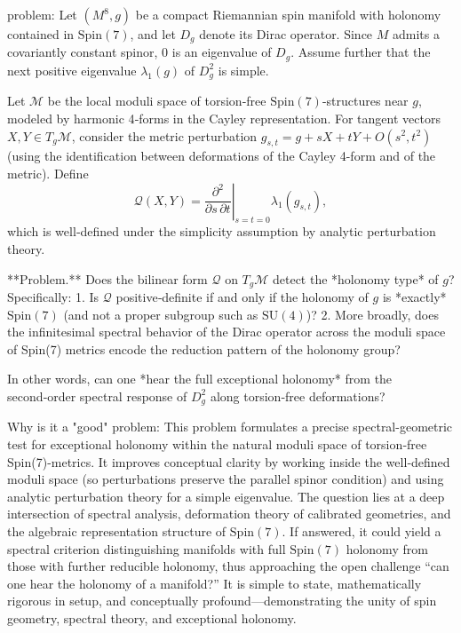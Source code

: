 problem:  
Let \((M^8,g)\) be a compact Riemannian spin manifold with holonomy contained in \(\mathrm{Spin}(7)\), and let \(D_g\) denote its Dirac operator. Since \(M\) admits a covariantly constant spinor, \(0\) is an eigenvalue of \(D_g\). Assume further that the next positive eigenvalue \(\lambda_1(g)\) of \(D_g^2\) is simple.  

Let \(\mathcal{M}\) be the local moduli space of torsion‑free \(\mathrm{Spin}(7)\)-structures near \(g\), modeled by harmonic 4‑forms in the Cayley representation. For tangent vectors \(X,Y\in T_g\mathcal{M}\), consider the metric perturbation \(g_{s,t}=g+sX+tY+O(s^2,t^2)\) (using the identification between deformations of the Cayley 4-form and of the metric). Define
\[
\mathcal{Q}(X,Y)=\left.\frac{\partial^2}{\partial s\,\partial t}\right|_{s=t=0}\lambda_1(g_{s,t}),
\]
which is well‑defined under the simplicity assumption by analytic perturbation theory.  

**Problem.**  
Does the bilinear form \(\mathcal{Q}\) on \(T_g\mathcal{M}\) detect the *holonomy type* of \(g\)? Specifically:
1. Is \(\mathcal{Q}\) positive‑definite if and only if the holonomy of \(g\) is *exactly* \(\mathrm{Spin}(7)\) (and not a proper subgroup such as \(\mathrm{SU}(4)\))?  
2. More broadly, does the infinitesimal spectral behavior of the Dirac operator across the moduli space of Spin(7) metrics encode the reduction pattern of the holonomy group?  

In other words, can one *hear the full exceptional holonomy* from the second‑order spectral response of \(D_g^2\) along torsion‑free deformations?  

Why is it a "good" problem:  
This problem formulates a precise spectral-geometric test for exceptional holonomy within the natural moduli space of torsion‑free Spin(7)-metrics. It improves conceptual clarity by working inside the well‑defined moduli space (so perturbations preserve the parallel spinor condition) and using analytic perturbation theory for a simple eigenvalue. The question lies at a deep intersection of spectral analysis, deformation theory of calibrated geometries, and the algebraic representation structure of \(\mathrm{Spin}(7)\). If answered, it could yield a spectral criterion distinguishing manifolds with full \(\mathrm{Spin}(7)\) holonomy from those with further reducible holonomy, thus approaching the open challenge “can one hear the holonomy of a manifold?” It is simple to state, mathematically rigorous in setup, and conceptually profound—demonstrating the unity of spin geometry, spectral theory, and exceptional holonomy.